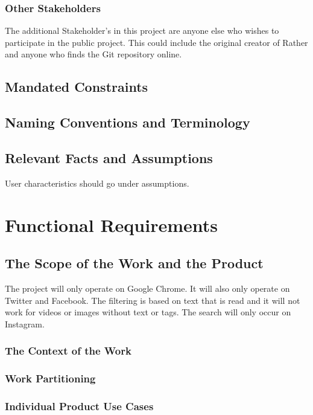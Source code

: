 \documentclass[12pt, titlepage]{article}
\begin{document}
\subsubsection{Other Stakeholders}
The additional Stakeholder's in this project are anyone else who wishes to participate in the public project. This could include the original creator of Rather and anyone who finds the Git repository online. 

\subsection{Mandated Constraints}

\subsection{Naming Conventions and Terminology}

\subsection{Relevant Facts and Assumptions}

User characteristics should go under assumptions.

\section{Functional Requirements}

\subsection{The Scope of the Work and the Product}
The project will only operate on Google Chrome. It will also only operate on Twitter and Facebook. The filtering is based on text that is read and it will not work for videos or images without text or tags. The search will only occur on Instagram.

\subsubsection{The Context of the Work}

\subsubsection{Work Partitioning}

\subsubsection{Individual Product Use Cases}
\end{document}
